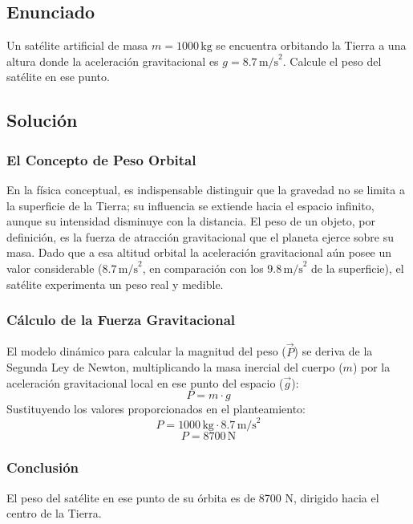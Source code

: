 \documentclass[12pt]{article}
\begin{document}
\subsection*{Enunciado}
Un satélite artificial de masa $m = 1000 \, \text{kg}$ se encuentra orbitando la Tierra a una altura donde la aceleración gravitacional es $g = 8.7 \, \text{m/s}^2$. Calcule el peso del satélite en ese punto.

\subsection*{Solución}

\subsubsection*{El Concepto de Peso Orbital}
En la física conceptual, es indispensable distinguir que la gravedad no se limita a la superficie de la Tierra; su influencia se extiende hacia el espacio infinito, aunque su intensidad disminuye con la distancia. El peso de un objeto, por definición, es la fuerza de atracción gravitacional que el planeta ejerce sobre su masa. Dado que a esa altitud orbital la aceleración gravitacional aún posee un valor considerable ($8.7 \, \text{m/s}^2$, en comparación con los $9.8 \, \text{m/s}^2$ de la superficie), el satélite experimenta un peso real y medible.

\subsubsection*{Cálculo de la Fuerza Gravitacional}
El modelo dinámico para calcular la magnitud del peso ($\vec{P}$) se deriva de la Segunda Ley de Newton, multiplicando la masa inercial del cuerpo ($m$) por la aceleración gravitacional local en ese punto del espacio ($\vec{g}$):
\begin{equation}
    P = m \cdot g
\end{equation}
Sustituyendo los valores proporcionados en el planteamiento:
\begin{equation}
    P = 1000 \, \text{kg} \cdot 8.7 \, \text{m/s}^2
\end{equation}
\begin{equation}
    P = 8700 \, \text{N}
\end{equation}

\subsubsection*{Conclusión}
El peso del satélite en ese punto de su órbita es de 8700 N, dirigido hacia el centro de la Tierra.
\end{document}
